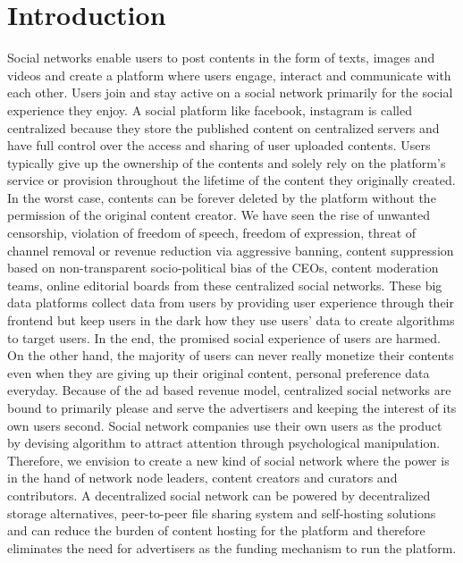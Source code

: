\documentclass[a4paper]{article}
\begin{document}
\section{Introduction}
    Social networks enable users to post contents in the form of texts, images and videos and create a platform where users engage, interact and communicate with each other. Users join and stay active on a social network primarily for the social experience they enjoy. A social platform like facebook, instagram is called centralized because they store the published content on centralized servers and have full control over the access and sharing of user uploaded contents. Users typically give up the ownership of the contents and solely rely on the platform's service or provision throughout the lifetime of the content they originally created. In the worst case, contents can be forever deleted by the platform without the permission of the original content creator. We have seen the rise of unwanted censorship, violation of freedom of speech, freedom of expression, threat of channel removal or revenue reduction via aggressive banning, content suppression based on non-transparent socio-political bias of the CEOs, content moderation teams, online editorial boards from these centralized social networks. These big data platforms collect data from users by providing user experience through their frontend but keep users in the dark how they use users' data to create algorithms to target users. In the end, the promised social experience of users are harmed. On the other hand, the majority of users can never really monetize their contents even when they are giving up their original content, personal preference data everyday. Because of the ad based revenue model, centralized social networks are bound to primarily please and serve the advertisers and keeping the interest of its own users second. Social network companies use their own users as the product by devising algorithm to attract attention through psychological manipulation. Therefore, we envision to create a new kind of social network where the power is in the hand of network node leaders, content creators and curators and contributors. A decentralized social network can be powered by decentralized storage alternatives, peer-to-peer file sharing system and self-hosting solutions and can reduce the burden of content hosting for the platform and therefore eliminates the need for advertisers as the funding mechanism to run the platform. 
\end{document}
